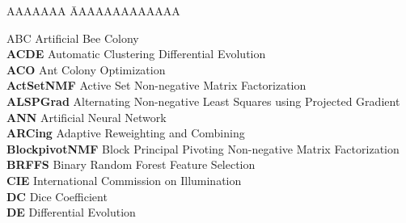 

\begin{nomenclature}


\fontsize{12}{10}
\doublespacing 
 \begin{tabbing}

 AAAAAAA \= AAAAAAAAAAAAA \kill

ABC \> \quad \quad\quad Artificial Bee Colony \\

 \textbf{ACDE} \> \quad \quad\quad Automatic Clustering Differential Evolution \\

 \textbf{ACO} \> \quad \quad\quad Ant Colony Optimization \\

 \textbf{ActSetNMF} \> \quad \quad\quad Active Set Non-negative Matrix Factorization\\

 \textbf{ALSPGrad} \> \quad \quad\quad Alternating Non-negative Least Squares using Projected Gradient\\

 \textbf{ANN} \> \quad \quad\quad Artificial Neural Network\\

 \textbf{ARCing} \> \quad \quad\quad Adaptive Reweighting and Combining\\

 \textbf{BlockpivotNMF} \> \quad \quad\quad Block Principal Pivoting Non-negative Matrix Factorization\\

 \textbf{BRFFS} \> \quad \quad\quad Binary Random Forest Feature Selection\\



%

  \textbf{CIE} \> \quad \quad\quad International Commission on Illumination \\

 \textbf{DC} \> \quad \quad\quad Dice Coefficient\\

 \textbf{DE} \> \quad \quad\quad Differential Evolution\\


\end{tabbing}
\end{nomenclature}
